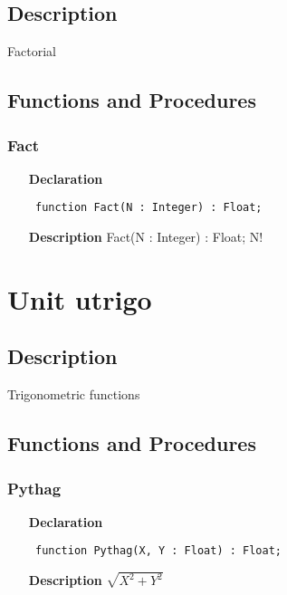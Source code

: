 \documentclass[12pt,a4paper,oneside]{report}
\newcommand{\declarationitem}[1]{\textbf{#1}}
\newcommand{\descriptiontitle}[1]{\textbf{#1}}
\newcommand{\code}[1]{\texttt{#1}}
\begin{document}
\subsection{Description}
Factorial 
\subsection{Functions and Procedures}
\subsubsection{Fact}
\label{ufact-Fact}
\begin{itemize}\item[\declarationitem{Declaration}\hfill]
	\begin{flushleft}
		\code{
			function Fact(N : Integer) : Float;}
		
	\end{flushleft}
	
	\par
	\item[\descriptiontitle{Description}]
	Fact(N : Integer) : Float; N!
	
\end{itemize}

\section{Unit utrigo}
\label{utrigo}
\subsection{Description}
Trigonometric functions 
\subsection{Functions and Procedures}
\subsubsection{Pythag}
\label{utrigo-Pythag}
\begin{itemize}\item[\declarationitem{Declaration}\hfill]
	\begin{flushleft}
		\code{
			function Pythag(X, Y : Float) : Float;}
		
	\end{flushleft}
	
	\par
	\item[\descriptiontitle{Description}]
	$\sqrt{X^2+Y^2}$
	
\end{itemize}
\end{document}
